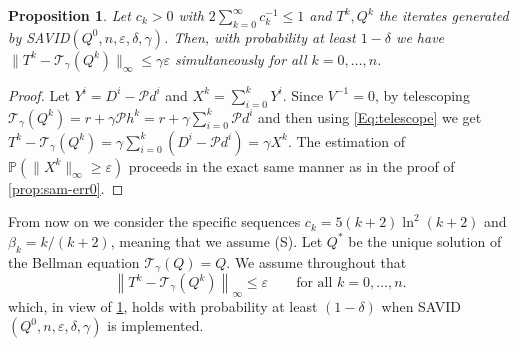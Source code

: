 \documentclass{article}
\newcommand{\cP}{\mathcal{P} }
\newcommand{\prob}{\mathbb{P}}
\newcommand{\T}{\mathcal{T}}
\newcommand*{\infn}[1]{\left\|{#1}\right\|_{\infty}}
\newcommand{\R}{r}
\theoremstyle{plain}
\newtheorem{proposition}[theorem]{Proposition}
\theoremstyle{definition}
\theoremstyle{remark}
\begin{document}
\begin{proposition}\label{prop:sam-err0-d}
Let $c_k>0$  with \mbox{$2\sum_{k=0}^\infty c_k^{-1}\leq 1$} and $T^k, Q^k$ the iterates generated by \mbox{\rm SAVID}$(Q^0,n,\varepsilon,\delta, \gamma)$.
Then, with probability at least $1-\delta$ we have $\|T^k-\T_\gamma(Q^k)\|_\infty\le  \gamma \varepsilon$ simultaneously for 
 all $k=0,\ldots,n$.
\end{proposition}
\vspace{-3ex}
\begin{proof}
Let $Y^i=D^i-\cP d^i$ and $X^k=\sum_{i=0}^kY^i$.
Since $V^{-1}=0$, by telescoping $\T_\gamma(Q^k)=\R+\gamma \cP h^k=\R+\gamma \sum_{i=0}^k \cP d^i$ and then using \eqref{Eq:telescope} we get $T^k-\T_\gamma(Q^k)=\gamma \sum_{i=0}^k(D^i-\cP d^i)=\gamma X^k$. The estimation of $\prob(\|X^k\|_\infty\geq\varepsilon)$ proceeds in the exact same manner as in the proof of \cref{prop:sam-err0}.
\end{proof}

From now on we consider the specific sequences $c_k=5(k+2)\ln^2(k+2)$ and $\beta_k=k/(k+2)$, meaning that we assume \mbox{\sc (S)}. Let $Q^*$ be the unique solution of the Bellman equation $\T_\gamma(Q)=Q$. We assume throughout that
\begin{equation}\label{Eq:Ek-d}
\infn{T^k-\T_\gamma(Q^{k})}\le \varepsilon\qquad \text{for all} \,\, k=0,\ldots,n.
\end{equation}
which, in view of \cref{prop:sam-err0-d}, holds with probability at least $(1-\delta)$ when \mbox{\rm SAVID}$(Q^0,n,\varepsilon,\delta, \gamma)$ is implemented.  
\end{document}
